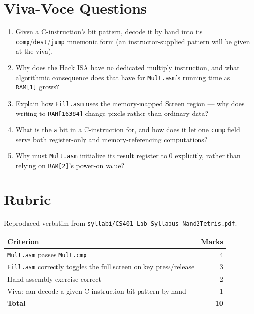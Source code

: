 \documentclass[11pt]{article}
\begin{document}
\section{Viva-Voce Questions}

\begin{enumerate}
  \item Given a C-instruction's bit pattern, decode it by hand into its \texttt{comp}/\texttt{dest}/\texttt{jump} mnemonic form (an instructor-supplied pattern will be given at the viva).
  \item Why does the Hack ISA have no dedicated multiply instruction, and what algorithmic consequence does that have for \texttt{Mult.asm}'s running time as \texttt{RAM[1]} grows?
  \item Explain how \texttt{Fill.asm} uses the memory-mapped Screen region --- why does writing to \texttt{RAM[16384]} change pixels rather than ordinary data?
  \item What is the \texttt{a} bit in a C-instruction for, and how does it let one \texttt{comp} field serve both register-only and memory-referencing computations?
  \item Why must \texttt{Mult.asm} initialize its result register to 0 explicitly, rather than relying on \texttt{RAM[2]}'s power-on value?
\end{enumerate}

\section{Rubric}

Reproduced verbatim from \texttt{syllabi/CS401\_Lab\_Syllabus\_Nand2Tetris.pdf}.

\begin{table}[h]
\centering
\begin{tabular}{@{}l r@{}}
\toprule
Criterion & Marks \\
\midrule
\texttt{Mult.asm} passes \texttt{Mult.cmp} & 4 \\
\texttt{Fill.asm} correctly toggles the full screen on key press/release & 3 \\
Hand-assembly exercise correct & 2 \\
Viva: can decode a given C-instruction bit pattern by hand & 1 \\
\midrule
\textbf{Total} & \textbf{10} \\
\bottomrule
\end{tabular}
\end{table}
\end{document}
